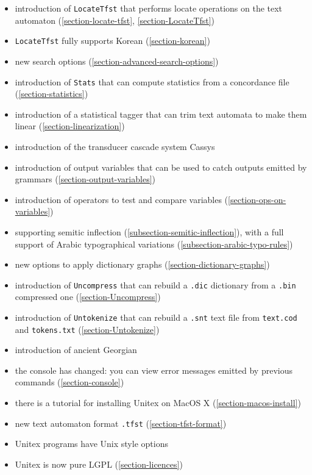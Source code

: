 \begin{itemize}
  \item introduction of \verb$LocateTfst$ that performs locate operations
        on the text automaton (\ref{section-locate-tfst}, \ref{section-LocateTfst})
  \item \verb$LocateTfst$ fully supports Korean (\ref{section-korean})
  \item new search options (\ref{section-advanced-search-options})
  \item introduction of \verb$Stats$ that can compute statistics from a
        concordance file (\ref{section-statistics})
  \item introduction of a statistical tagger that can trim text automata to make them
        linear (\ref{section-linearization})
  \item introduction of the transducer cascade system Cassys
  \item introduction of output variables that can be used to catch outputs emitted
        by grammars (\ref{section-output-variables})
  \item introduction of operators to test and compare variables (\ref{section-ops-on-variables})
  \item supporting semitic inflection (\ref{subsection-semitic-inflection}), with a full support 
        of Arabic typographical variations (\ref{subsection-arabic-typo-rules})
  \item new options to apply dictionary graphs (\ref{section-dictionary-graphs}) 
  \item introduction of \verb$Uncompress$ that can rebuild a \verb$.dic$
        dictionary from a \verb$.bin$ compressed one (\ref{section-Uncompress})
  \item introduction of \verb$Untokenize$ that can rebuild a \verb$.snt$
        text file from \verb$text.cod$ and \verb$tokens.txt$ (\ref{section-Untokenize})
  \item introduction of ancient Georgian
  \item the console has changed: you can view error messages emitted by
        previous commands (\ref{section-console})
  \item there is a tutorial for installing Unitex on MacOS X 
       (\ref{section-macos-install})
  \item new text automaton format \verb+.tfst+ (\ref{section-tfst-format})          
  \item Unitex programs have Unix style options
  \item Unitex is now pure LGPL (\ref{section-licences})

\end{itemize}
